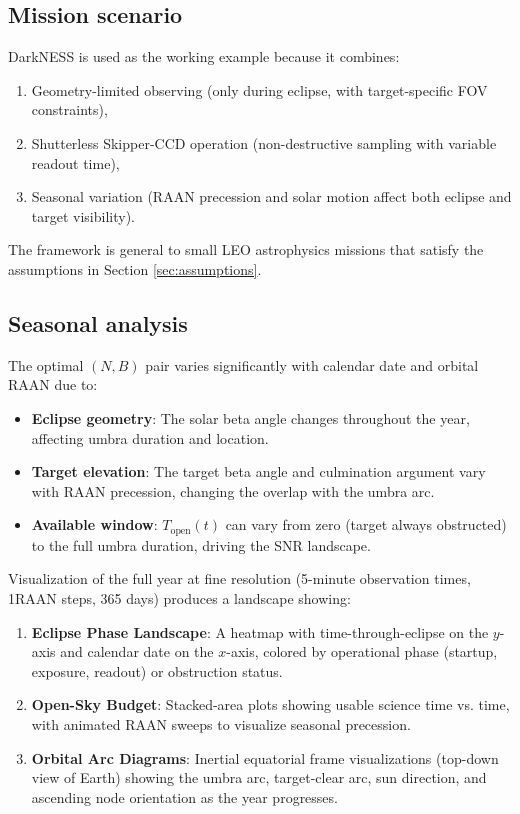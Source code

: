 \documentclass[preprint,12pt]{elsarticle}
\theoremstyle{definition}
\theoremstyle{remark}
\begin{document}
\subsection{Mission scenario}

DarkNESS is used as the working example because it combines:
\begin{enumerate}
\item Geometry-limited observing (only during eclipse, with target-specific FOV constraints),
\item Shutterless Skipper-CCD operation (non-destructive sampling with variable readout time),
\item Seasonal variation (RAAN precession and solar motion affect both eclipse and target visibility).
\end{enumerate}

The framework is general to small LEO astrophysics missions that satisfy the assumptions in Section \ref{sec:assumptions}.

\subsection{Seasonal analysis}

The optimal $(N, B)$ pair varies significantly with calendar date and orbital RAAN due to:
\begin{itemize}
\item \textbf{Eclipse geometry}: The solar beta angle changes throughout the year, affecting umbra duration and location.
\item \textbf{Target elevation}: The target beta angle and culmination argument vary with RAAN precession, changing the overlap with the umbra arc.
\item \textbf{Available window}: $T_{\mathrm{open}}(t)$ can vary from zero (target always obstructed) to the full umbra duration, driving the SNR landscape.
\end{itemize}

Visualization of the full year at fine resolution (5-minute observation times, 1\textdegree RAAN steps, 365 days) produces a landscape showing:
\begin{enumerate}
\item \textbf{Eclipse Phase Landscape}: A heatmap with time-through-eclipse on the $y$-axis and calendar date on the $x$-axis, colored by operational phase (startup, exposure, readout) or obstruction status.
\item \textbf{Open-Sky Budget}: Stacked-area plots showing usable science time vs. time, with animated RAAN sweeps to visualize seasonal precession.
\item \textbf{Orbital Arc Diagrams}: Inertial equatorial frame visualizations (top-down view of Earth) showing the umbra arc, target-clear arc, sun direction, and ascending node orientation as the year progresses.
\end{enumerate}
\end{document}
